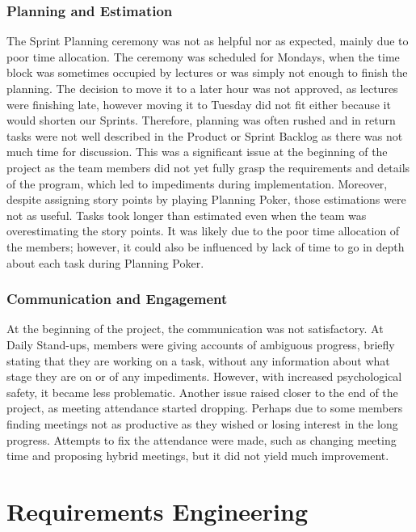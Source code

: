 \subsubsection*{Planning and Estimation}
The Sprint Planning ceremony was not as helpful nor as expected, mainly due to poor time allocation. The ceremony was scheduled for Mondays, when the time block was sometimes occupied by lectures or was simply not enough to finish the planning. The decision to move it to a later hour was not approved, as lectures were finishing late, however moving it to Tuesday did not fit either because it would shorten our Sprints. Therefore, planning was often rushed and in return tasks were not well described in the Product or Sprint Backlog as there was not much time for discussion. This was a significant issue at the beginning of the project as the team members did not yet fully grasp the requirements and details of the program, which led to impediments during implementation. Moreover, despite assigning story points by playing Planning Poker, those estimations were not as useful. Tasks took longer than estimated even when the team was overestimating the story points. It was likely due to the poor time allocation of the members; however, it could also be influenced by lack of time to go in depth about each task during Planning Poker.
\subsubsection{Communication and Engagement}
At the beginning of the project, the communication was not satisfactory. At Daily Stand-ups, members were giving accounts of ambiguous progress, briefly stating that they are working on a task, without any information about what stage they are on or of any impediments. However, with increased psychological safety, it became less problematic. Another issue raised closer to the end of the project, as meeting attendance started dropping. Perhaps due to some members finding meetings not as productive as they wished or losing interest in the long progress. Attempts to fix the attendance were made, such as changing meeting time and proposing hybrid meetings, but it did not yield much improvement.

\section{Requirements Engineering}

